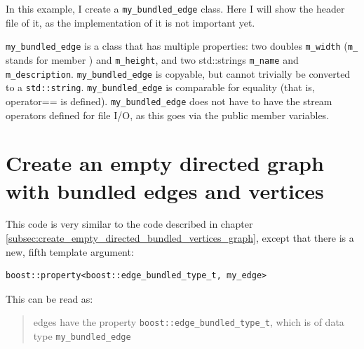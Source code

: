 In this example, I create a \verb;my_bundled_edge; class.
Here I will show the header file of it, as the implementation of it is
not important yet.



\verb;my_bundled_edge; is a class that has multiple properties: 
two doubles \verb;m_width; 
(\verb;m_;  stands for member ) 
and \verb;m_height;, 
and two std::strings \verb;m_name; and \verb;m_description;.
\verb;my_bundled_edge; is copyable, 
but cannot trivially be converted to a \verb;std::string;. 
\verb;my_bundled_edge; is comparable for equality 
(that is, operator== is defined).
\verb;my_bundled_edge; does not have to have the stream operators defined for
file I/O, as this goes via the public member variables.

\section{Create an empty directed graph with bundled edges and vertices}
\label{subsec:create_empty_directed_bundled_edges_and_vertices_graph}



This code is very similar to the code described in chapter 
\ref{subsec:create_empty_directed_bundled_vertices_graph}, 
except that there is a new, fifth template argument:

\begin{verbatim}
boost::property<boost::edge_bundled_type_t, my_edge>
\end{verbatim}

This can be read as: 
\begin{quote}
edges have the property \verb;boost::edge_bundled_type_t;, 
which is of data type \verb;my_bundled_edge;
\end{quote}

